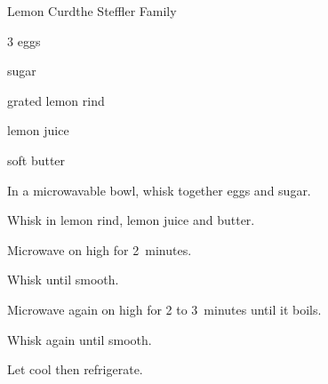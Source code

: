 \begin{recipe}{Lemon Curd}{the Steffler Family}{}

\begin{ingredients}
\item 3 eggs
\item \C{\threequarter} sugar
\item {} grated lemon rind
\item \C{\half} lemon juice
\item {} soft butter
\end{ingredients}

\begin{directions}
\item In a microwavable bowl, whisk together eggs and sugar.
\item Whisk in lemon rind, lemon juice and butter.
\item Microwave on high for 2~minutes.
\item Whisk until smooth.
\item Microwave again on high for 2 to 3~minutes until it boils.
\item Whisk again until smooth.
\item Let cool then refrigerate.
\end{directions}

\end{recipe}
